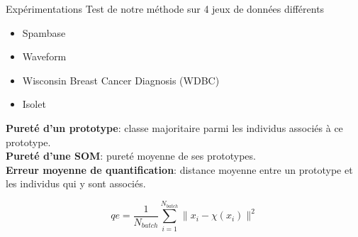 \documentclass[hyperref={pdfpagelabels=false}]{beamer}
\begin{document}
        
        \begin{frame}{Expérimentations}
            Test de notre méthode sur 4 jeux de données différents
            \begin{itemize}
                \item Spambase
                \item Waveform
                \item Wisconsin Breast Cancer Diagnosis (WDBC)
                \item Isolet
            \end{itemize}

            \textbf{Pureté d'un prototype}: classe majoritaire parmi les
            individus associés à ce prototype.\\
            \textbf{Pureté d'une SOM}: pureté moyenne de ses prototypes.\\
            \textbf{Erreur moyenne de quantification}: distance moyenne
            entre un prototype et les individus qui y sont associés.

            \begin{equation*}
                qe = \frac{1}{N_{batch}}\sum_{i=1}^{N_{batch}}\|x_i -
                \chi(x_i)\|^2
            \end{equation*}
        \end{frame}
\end{document}
